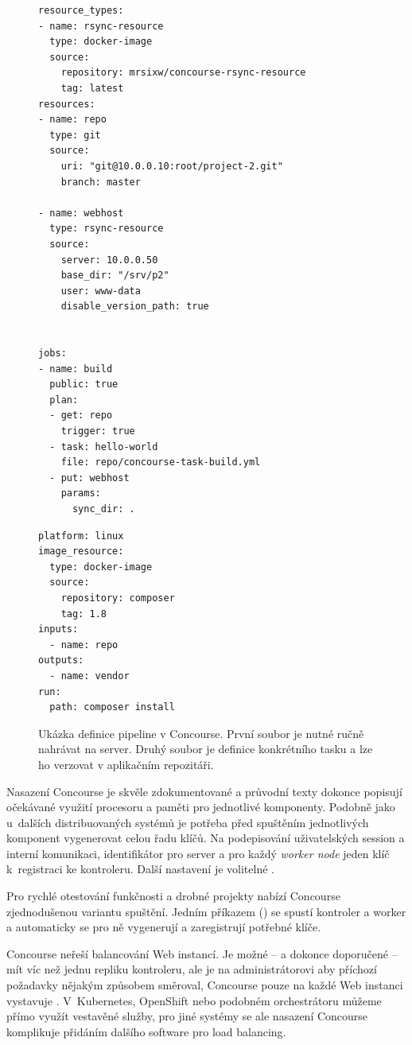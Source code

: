         \begin{figure}[H]
            \centering
                \begin{verbatim}
resource_types:
- name: rsync-resource
  type: docker-image
  source:
    repository: mrsixw/concourse-rsync-resource
    tag: latest
resources:
- name: repo
  type: git
  source:
    uri: "git@10.0.0.10:root/project-2.git"
    branch: master

- name: webhost
  type: rsync-resource
  source:
    server: 10.0.0.50
    base_dir: "/srv/p2"
    user: www-data
    disable_version_path: true


jobs:
- name: build
  public: true
  plan:
  - get: repo
    trigger: true
  - task: hello-world
    file: repo/concourse-task-build.yml
  - put: webhost
    params:
      sync_dir: .
                \end{verbatim}
                \begin{verbatim}
platform: linux
image_resource:
  type: docker-image
  source:
    repository: composer
    tag: 1.8
inputs:
  - name: repo
outputs:
  - name: vendor
run:
  path: composer install
\end{verbatim}
            \caption{Ukázka definice pipeline v Concourse. První soubor je nutné ručně nahrávat na server. Druhý soubor je definice konkrétního tasku a lze ho verzovat v aplikačním repozitáři.}
        \end{figure}

        \newpage
        Nasazení Concourse je skvěle zdokumentované a průvodní texty dokonce popisují očekávané využití procesoru a paměti pro jednotlivé komponenty. Podobně jako u~dalších distribuovaných systémů je potřeba před spuštěním jednotlivých komponent vygenerovat celou řadu klíčů. Na podepisování uživatelských session a interní komunikaci, identifikátor pro  server a pro každý \textit{worker node} jeden klíč k~registraci ke kontroleru. Další nastavení je volitelné .

        Pro rychlé otestování funkčnosti a drobné projekty nabízí Concourse zjednodušenou variantu spuštění. Jedním příkazem () se spustí kontroler a worker a automaticky se pro ně vygenerují a zaregistrují potřebné klíče.

        Concourse neřeší balancování Web instancí. Je možné -- a dokonce doporučené -- mít víc než jednu repliku kontroleru, ale je na administrátorovi aby příchozí požadavky nějakým způsobem směroval, Concourse pouze na každé Web instanci vystavuje  . V~Kubernetes, OpenShift nebo podobném orchestrátoru můžeme přímo využít vestavěné služby, pro jiné systémy se ale nasazení Concourse komplikuje přidáním dalšího software pro load balancing.

